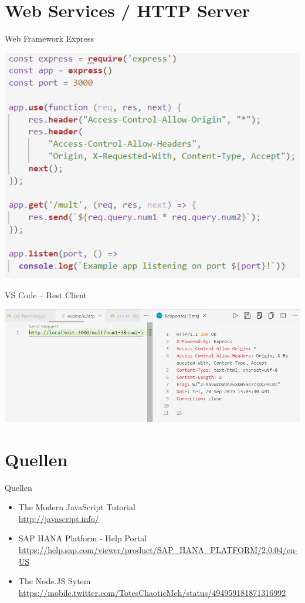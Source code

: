 \documentclass[t,handout]{beamer}
\begin{document}
\section{Web Services / HTTP Server}

\begin{frame}{Web Framework Express}
  \begin{center}
    \includegraphics[scale=.5]{fig/express.png}
  \end{center}
\end{frame}

\begin{frame}{VS Code -- Rest Client}
  \begin{center}
    \includegraphics[scale=.45]{fig/express-call.png}
  \end{center}
\end{frame}


\section{Quellen}
\begin{frame}{Quellen}
  \begin{itemize}
    \item The Modern JavaScript Tutorial\\ \url{http://javascript.info/}
    \item SAP HANA Platform - Help Portal\\ \url{https://help.sap.com/viewer/product/SAP_HANA_PLATFORM/2.0.04/en-US}
    \item The Node.JS Sytem \\ \url{https://mobile.twitter.com/TotesChaoticMeh/status/494959181871316992}
  \end{itemize}
\end{frame}
\end{document}
